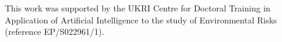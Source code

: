 \documentclass[journal abbreviation, manuscript]{copernicus}
\begin{document}
\noappendix       %




\appendixfigures  %

\appendixtables   %







\begin{acknowledgements}
This work was supported by the UKRI Centre for Doctoral Training in Application of Artificial Intelligence to the study of Environmental Risks (reference EP/S022961/1).
\end{acknowledgements}





\end{document}
